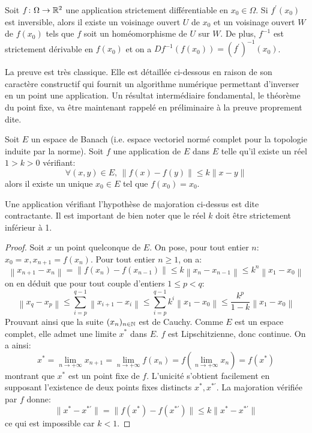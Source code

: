 \begin{fthm}
Soit $f \colon \Omega \to \mathbb{R}^2$ une application strictement différentiable en $x_0 \in \Omega$. Si $f^\prime(x_0)$ est inversible, alors il existe un voisinage ouvert $U$ de $x_0$ et un voisinage ouvert $W$ de $f(x_0)$ tels que $f$ soit un homéomorphisme de $U$ sur $W$. De plus, $f^{-1}$ est strictement dérivable en $f(x_0)$ et on a $Df^{-1}(f(x_0)) = \left(f^{\prime}\right)^{-1}(x_0)$.
\end{fthm}
La preuve est très classique. Elle est détaillée ci-dessous en raison de son caractère constructif qui fournit un algorithme numérique permettant d'inverser en un point une application. Un résultat intermédiaire fondamental, le théorème du point fixe, va être maintenant rappelé en préliminaire à la preuve proprement dite.

\begin{fthm} \label{thm:pt_fixe}
Soit $E$ un espace de Banach (i.e. espace vectoriel normé complet pour la topologie induite par la norme). Soit $f$ une application de $E$ dans $E$ telle qu'il existe un réel $1 > k > 0$ vérifiant:
\[
\forall (x,y) \in E, \, \|f(x)-f(y)\| \leq k \|x-y\|
\]
alors il existe un unique $x_0 \in E$ tel que $f(x_0)=x_0$.
\end{fthm}
Une application vérifiant l'hypothèse de majoration ci-dessus est dite contractante. Il est important de bien noter que le réel $k$ doit être strictement inférieur à 1. 
\begin{proof}
Soit $x$ un point quelconque de $E$. On pose, pour tout entier $n$: $x_0 = x, x_{n+1}=f(x_n)$. Pour tout entier $n \geq 1$, on a:
\[
\left\| x_{n+1}-x_n \right \| = \left\| f(x_n)-f(x_{n-1}) \right \| \leq k \left\| x_n-x_{n-1} \right \|
\leq k^n \left\| x_1-x_0 \right \| 
\]
on en déduit que pour tout couple d'entiers $1 \leq p < q$:
\[
\left\| x_q - x_p \right \| \leq \sum_{i=p}^{q-1} \left\| x_{i+1} - x_i \right \| \leq \sum_{i=p}^{q-1} k^i \left\| x_1-x_0 \right \| \leq \frac{k^p}{1-k} \left\| x_1-x_0 \right \|
\]
Prouvant ainsi que la suite $(x_n)_{n \in \mathbb{N}}$ est de Cauchy. Comme $E$ est un espace complet, elle admet une limite $x^*$ dans $E$. $f$ est Lipschitzienne, donc continue. On a ainsi:
\[
x^* = \lim_{n \to +\infty } x_{n+1} = \lim_{n \to +\infty} f(x_n) = f\left( \lim_{n \to +\infty} x_n \right)
=f(x^*)
\]
montrant que $x^*$ est un point fixe de $f$. L'unicité s'obtient facilement en supposant l'existence de deux points fixes distincts $x^*, x^{*\prime}$. La majoration vérifiée par $f$ donne:
\[
\|x^* - x^{*\prime}\|= \|f(x^*) - f(x^{*\prime})\| \leq k \|x^* - x^{*\prime}\|
\] 
ce qui est impossible car $k < 1$.
\end{proof}
